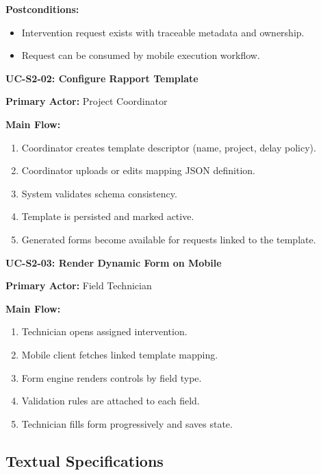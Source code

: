 \textbf{Postconditions:}
\begin{itemize}
\item Intervention request exists with traceable metadata and ownership.
\item Request can be consumed by mobile execution workflow.
\end{itemize}

\textbf{UC-S2-02: Configure Rapport Template}

\textbf{Primary Actor:} Project Coordinator

\textbf{Main Flow:}
\begin{enumerate}
\item Coordinator creates template descriptor (name, project, delay policy).
\item Coordinator uploads or edits mapping JSON definition.
\item System validates schema consistency.
\item Template is persisted and marked active.
\item Generated forms become available for requests linked to the template.
\end{enumerate}

\textbf{UC-S2-03: Render Dynamic Form on Mobile}

\textbf{Primary Actor:} Field Technician

\textbf{Main Flow:}
\begin{enumerate}
\item Technician opens assigned intervention.
\item Mobile client fetches linked template mapping.
\item Form engine renders controls by field type.
\item Validation rules are attached to each field.
\item Technician fills form progressively and saves state.
\end{enumerate}

\subsection{Textual Specifications}

